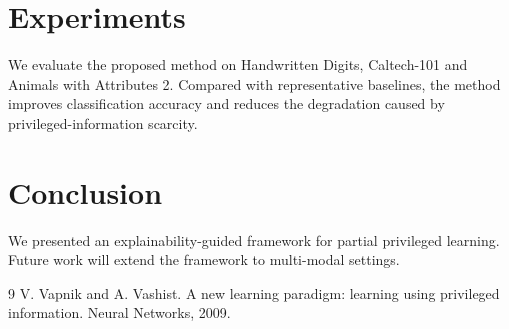\documentclass[11pt]{article}
\begin{document}
\section{Experiments}\label{experiments}

We evaluate the proposed method on Handwritten Digits, Caltech-101 and
Animals with Attributes 2. Compared with representative baselines, the method
improves classification accuracy and reduces the degradation caused by
privileged-information scarcity.

\section{Conclusion}\label{conclusion}

We presented an explainability-guided framework for partial privileged
learning. Future work will extend the framework to multi-modal settings.

\begin{thebibliography}{9}
 V. Vapnik and A. Vashist. A new learning paradigm: learning using privileged information. Neural Networks, 2009.
\end{thebibliography}
\end{document}
